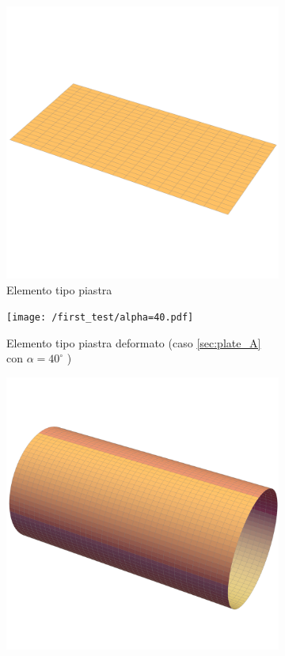 \documentclass[a4paper,num-refs]{oup-contemporary}
\begin{document}
\begin{figure}[bt!]
	\centering
	\begin{subfigure}[t]{0.24\textwidth}
		\centering

 \includegraphics[width=\textwidth]{plate_.pdf}
 				\caption{Elemento tipo piastra}
		\label{fig:y equals x}
	\end{subfigure}
	\hfill
	\begin{subfigure}[t]{0.24\textwidth}
		\centering
		\texttt{[image: /first\_test/alpha=40.pdf]}
		\caption{Elemento tipo piastra deformato (caso \cref{sec:plate_A}  con $\alpha=40^\circ$ )}
		\label{fig:five over x}
	\end{subfigure}
	\hfill
	\begin{subfigure}[t]{0.24\textwidth}
		\centering
 \includegraphics[width=\textwidth]{cyl_.pdf}

\end{subfigure}
\end{figure}
\end{document}
